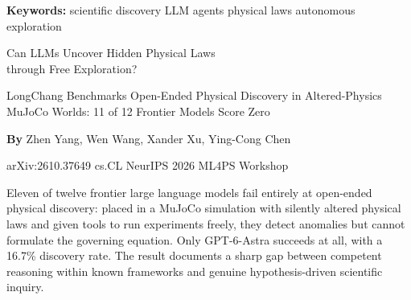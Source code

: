 \documentclass[10pt,twocolumn]{article}
\begin{document}
\setlength{\parindent}{0pt}
\setlength{\parskip}{4pt}

{\small\color{keywordgray}\textbf{Keywords:}
  scientific discovery \textbullet{}
  LLM agents \textbullet{}
  physical laws \textbullet{}
  autonomous exploration}\par\vspace{4pt}

{\LARGE\bfseries\raggedright
  Can LLMs Uncover Hidden Physical Laws\\
  through Free Exploration?}\par\vspace{4pt}

{\large\itshape\raggedright
  LongChang Benchmarks Open-Ended Physical Discovery in
  Altered-Physics MuJoCo Worlds: 11 of 12 Frontier Models Score Zero}\par\vspace{6pt}

{\small\textbf{By} Zhen Yang, Wen Wang, Xander Xu, Ying-Cong Chen}\par\vspace{2pt}

{\small\color{keywordgray}arXiv:2610.37649 \textbullet{}
  cs.CL \textbullet{} NeurIPS 2026 ML4PS Workshop}
\par\vspace{2pt}\noindent{\color{rulered}\rule{\columnwidth}{0.6pt}}\vspace{6pt}

Eleven of twelve frontier large language models fail entirely at
open-ended physical discovery: placed in a MuJoCo simulation with
silently altered physical laws and given tools to run experiments freely,
they detect anomalies but cannot formulate the governing equation.
Only GPT-6-Astra succeeds at all, with a 16.7\% discovery rate.
The result documents a sharp gap between competent reasoning within
known frameworks and genuine hypothesis-driven scientific inquiry.
\end{document}
